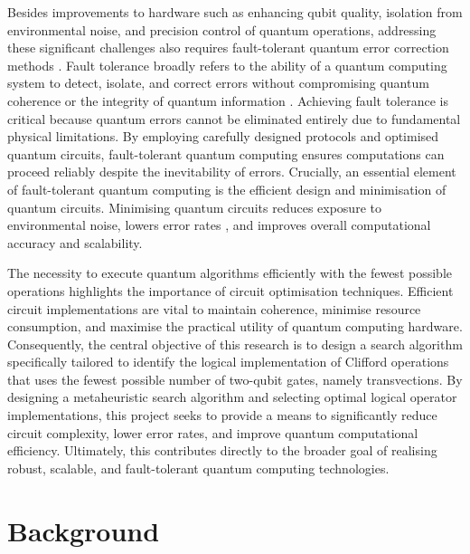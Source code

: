 Besides improvements to hardware such as enhancing qubit quality, isolation from environmental noise, and precision control of quantum operations, addressing these significant challenges also requires fault-tolerant quantum error correction methods \cite{Calderbank_1996}. Fault tolerance broadly refers to the ability of a quantum computing system to detect, isolate, and correct errors without compromising quantum coherence or the integrity of quantum information \cite{cdi_askewsholts_vlebooks_9780511985249}. Achieving fault tolerance is critical because quantum errors cannot be eliminated entirely due to fundamental physical limitations. By employing carefully designed protocols and optimised quantum circuits, fault-tolerant quantum computing ensures computations can proceed reliably despite the inevitability of errors. Crucially, an essential element of fault-tolerant quantum computing is the efficient design and minimisation of quantum circuits. Minimising quantum circuits reduces exposure to environmental noise, lowers error rates \cite{yu2022analysiserrorpropagationquantum}, and improves overall computational accuracy and scalability.

The necessity to execute quantum algorithms efficiently with the fewest possible operations highlights the importance of circuit optimisation techniques. Efficient circuit implementations are vital to maintain coherence, minimise resource consumption, and maximise the practical utility of quantum computing hardware. Consequently, the central objective of this research is to design a search algorithm specifically tailored to identify the logical implementation of Clifford operations that uses the fewest possible number of two-qubit gates, namely transvections. By designing a metaheuristic search algorithm and selecting optimal logical operator implementations, this project seeks to provide a means to significantly reduce circuit complexity, lower error rates, and improve quantum computational efficiency. Ultimately, this contributes directly to the broader goal of realising robust, scalable, and fault-tolerant quantum computing technologies.

\section{Background}

